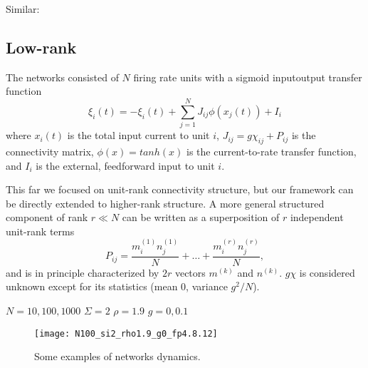 \documentclass{article} %
\newcounter{ct}
\theoremstyle{definition}
\theoremstyle{remark}
\begin{document}
 
 
 Similar:
 \citep{samsonovich1997path}
 \citep{redish1996coupled} %
 

%


\subsection{Low-rank}\label{sec:supp:lowrank}


The networks consisted of $N$ firing rate units with a sigmoid inputoutput transfer function \citep{mastrogiuseppe2018}
\begin{equation}
\xi_i(t) = - \xi_i(t) + \sum_{j=1}^{N} J_{ij}\phi(x_j(t)) + I_i
\label{eq:1}
\end{equation}
where $x_i(t)$ is the total input current to unit $i$,
$ J_{ij} = g\chi_{ij} + P_{ij}$ is the connectivity matrix, 
$\phi(x) = tanh(x)$ is the current-to-rate transfer function, and $I_i$ is the external, feedforward input to unit $i$.

This far we focused on unit-rank connectivity structure, but our framework can be directly extended to higher-rank structure. A more general structured component of rank $r\ll N$ can be written as a superposition of $r$ independent unit-rank terms 
\begin{equation}
P_{ij} = \frac{m^{(1)}_i n^{(1)}_j}{N} + \dots + \frac{m^{(r)}_i n^{(r)}_j}{N},
\end{equation} and is in principle characterized by $2r$ vectors $m^{(k)}$ and $n^{(k)}$.
$g\chi$ is considered unknown except for its statistics (mean 0, variance $g^2/N$).

$N=10,100,1000$
$\Sigma=2$
$\rho=1.9$
$g=0, 0.1$


\begin{figure}[h]
\centering
\texttt{[image: N100\_si2\_rho1.9\_g0\_fp4.8.12]}
\caption{Some examples of networks dynamics.}
\label{fig:low_rank_examples}
\end{figure}


\end{document}
